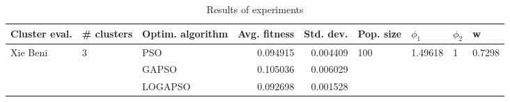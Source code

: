 \begin{table}
\centering
\caption{Results of experiments}
\begin{tabular}{lllrrllll}
\toprule
            Cluster eval. &        \# clusters & Optim. algorithm &  Avg. fitness &  Std. dev. &            Pop. size &               $\phi_{1}$ &         $\phi_{2}$ &                       w \\
\midrule
\multirow{3}{*}{Xie Beni} & \multirow{3}{*}{3} &              PSO &      0.094915 &   0.004409 & \multirow{3}{*}{100} & \multirow{3}{*}{1.49618} & \multirow{3}{*}{1} & \multirow{3}{*}{0.7298} \\
                          &                    &            GAPSO &      0.105036 &   0.006029 &                      &                          &                    &                         \\
                          &                    &          LOGAPSO &      0.092698 &   0.001528 &                      &                          &                    &                         \\
\bottomrule
\end{tabular}
\end{table}
